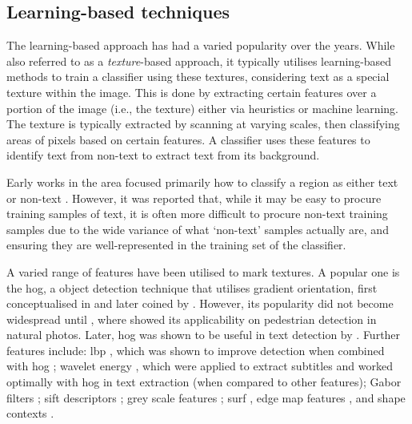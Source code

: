 \clearpage

\subsection{Learning-based techniques}
\label{sec:detection:learning}

The learning-based approach has had a varied popularity over the years. While also referred to as a \textit{texture}-based approach, it typically utilises learning-based methods to train a classifier using these textures, considering text as a special texture within the image. This is done by extracting certain features over a portion of the image (i.e., the texture) either via heuristics or machine learning. The texture is typically extracted by scanning at varying scales, then classifying areas of pixels based on certain features. A classifier uses these features to identify text from non-text to extract text from its background.

Early works in the area focused primarily how to classify a region as either text or non-text \citep{Sobottka:1999wi, Lienhart:2002ub, Li:2000uf, Kim:2003wj}. However, it was reported that, while it may be easy to procure training samples of text, it is often more difficult to procure non-text training samples \cite{Sung:1998vt,Heisele:2001ue} due to the wide variance of what `non-text' samples actually are, and ensuring they are well-represented in the training set of the classifier.

A varied range of features have been utilised to mark textures. A popular one is the \gls{hog}, a object detection technique that utilises gradient orientation, first conceptualised in \citep{McConnell:1986ws} and later coined by \citet{Freeman:1995uh}. However, its popularity did not become widespread until \citep{Dalal:2005jq}, where \citeauthor{Dalal:2005jq} showed its applicability on pedestrian detection in natural photos. Later, \gls{hog} was shown to be useful in text detection by \citet{Hanif:2008un}. Further features include: \gls{lbp} \citep{Ojala:1994hz}, which was shown to improve detection when combined with \gls{hog} \cite{Wang:2009wi}; wavelet energy \citep{Mohan:2001vb, Viola:2003ud}, which were applied to extract subtitles \citep{Gllavata:2004vq} and worked optimally with \gls{hog} in text extraction \citep{Pan:2010cj} (when compared to other features); Gabor filters \citep{Liu:2005et}; \gls{sift} descriptors \citep{Lowe:2004kp}; grey scale features \citep{Kim:2003wj}; \gls{surf} \cite{Bay:2008ud}, edge map features \cite{Chen:2004tj}, and shape contexts \citep{Belongie:2001uj}.

